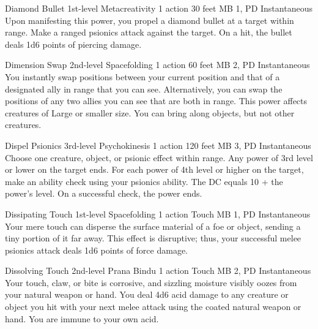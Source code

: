 \DndPowerHeader%
  {Diamond Bullet}
  {1st-level Metacreativity}
  {1 action}
  {30 feet}
  {MB 1, PD \lvlone}
  {Instantaneous}
  Upon manifesting this power,
  you propel a diamond bullet at a target within range.
  Make a ranged psionics attack against the target.
  On a hit, the bullet deals 1d6 points of piercing damage.

\DndPowerHeader%
  {Dimension Swap}
  {2nd-level Spacefolding}
  {1 action}
  {60 feet}
  {MB 2, PD \lvltwo}
  {Instantaneous}
  You instantly swap positions between your current position
  and that of a designated ally in range that you can see.
  Alternatively, you can swap the positions of
  any two allies you can see that are both in range.
  This power affects creatures of Large or smaller size.
  You can bring along objects, but not other creatures.

\DndPowerHeader%
  {Dispel Psionics}
  {3rd-level Psychokinesis}
  {1 action}
  {120 feet}
  {MB 3, PD \lvlthree}
  {Instantaneous}
  Choose one creature, object, or psionic effect within range.
  Any power of 3rd level or lower on the target ends.
  For each power of 4th level or higher on the target,
  make an ability check using your psionics ability.
  The DC equals 10 + the power's level.
  On a successful check, the power ends.

\DndPowerHeader%
  {Dissipating Touch}
  {1st-level Spacefolding}
  {1 action}
  {Touch}
  {MB 1, PD \lvlone}
  {Instantaneous}
Your mere touch can disperse the surface material of a foe or object,
sending a tiny portion of it far away.
This effect is disruptive; thus,
your successful melee psionics attack deals 1d6 points of force damage.

\DndPowerHeader%
  {Dissolving Touch}
  {2nd-level Prana Bindu}
  {1 action}
  {Touch}
  {MB 2, PD \lvltwo}
  {Instantaneous}
  Your touch, claw, or bite is corrosive,
  and sizzling moisture visibly oozes from your
  natural weapon or hand.
  You deal 4d6 acid damage to any creature or object
  you hit with your next melee attack using the coated
  natural weapon or hand.
  You are immune to your own acid.


